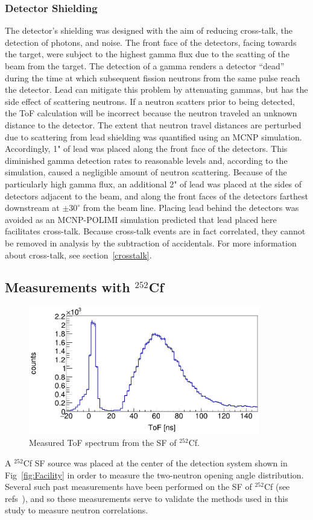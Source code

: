 \subsubsection{Detector Shielding}
The detector's shielding was designed with the aim of reducing cross-talk, the detection of photons, and noise.
The front face of the detectors, facing towards the target, were subject to the highest gamma flux due to the scatting of the beam from the target.
The detection of a gamma renders a detector ``dead'' during the time at which subsequent fission neutrons from the same pulse reach the detector.
Lead can mitigate this problem by attenuating gammas, but has the side effect of scattering neutrons.
If a neutron scatters prior to being detected, the ToF calculation will be incorrect because the neutron traveled an unknown distance to the detector.
The extent that neutron travel distances are perturbed due to scattering from lead shielding was quantified using an MCNP simulation.
Accordingly, 1" of lead was placed along the front face of the detectors.
This diminished gamma detection rates to reasonable levels and, according to the simulation, caused a negligible amount of neutron scattering.
Because of the particularly high gamma flux, an additional 2" of lead was placed at the sides of detectors adjacent to the beam, and along the front faces of the detectors farthest downstream at $\pm30^{\circ}$ from the beam line.
Placing lead behind the detectors was avoided as an MCNP-POLIMI simulation predicted that lead placed here facilitates cross-talk.
Because cross-talk events are in fact correlated, they cannot be removed in analysis by the subtraction of accidentals.
For more information about cross-talk, see section~\ref{crosstalk}.

\subsection{Measurements with $^{252}$Cf}
\begin{figure}[h]
\includegraphics[width=0.9\textwidth]{Content/Methods/Cf252ToF.png}
\caption{Measured ToF spectrum from the SF of $^{252}$Cf.}
\label{fig:Cf252ToF}
\end{figure}
A $^{252}$Cf SF source was placed at the center of the detection system shown in Fig~\ref{fig:Facility} in order to measure the two-neutron opening angle distribution.
Several such past measurements have been performed on the SF of $^{252}$Cf (see refs~\cite{1975Cf252, Pozzi2014, 2008CF252, Verbeke2018}), and so these measurements serve to validate the methods used in this study to measure neutron correlations.

